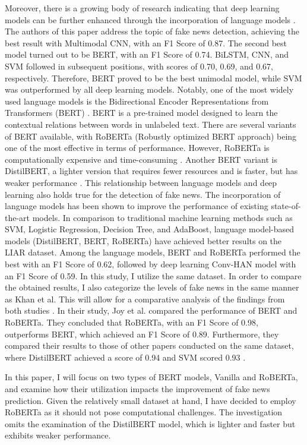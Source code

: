 Moreover, there is a growing body of research indicating that deep learning models can be further enhanced through the incorporation of language models \autocite{Conroy2015}. The authors of this paper address the topic of fake news detection, achieving the best result with Multimodal CNN, with an F1 Score of 0.87. The second best model turned out to be BERT, with an F1 Score of 0.74. BiLSTM, CNN, and SVM followed in subsequent positions, with scores of 0.70, 0.69, and 0.67, respectively. Therefore, BERT proved to be the best unimodal model, while SVM was outperformed by all deep learning models. Notably, one of the most widely used language models is the Bidirectional Encoder Representations from Transformers (BERT) \autocite{Devlin2018}. BERT is a pre-trained model designed to learn the contextual relations between words in unlabeled text. There are several variants of BERT available, with RoBERTa (Robustly optimized BERT approach) being one of the most effective in terms of performance. However, RoBERTa is computationally expensive and time-consuming \autocite{Liu2019}. Another BERT variant is DistilBERT, a lighter version that requires fewer resources and is faster, but has weaker performance \autocite{Sanh2019}. This relationship between language models and deep learning also holds true for the detection of fake news. The incorporation of language models has been shown to improve the performance of existing state-of-the-art models. In comparison to traditional machine learning methods such as SVM, Logistic Regression, Decision Tree, and AdaBoost, language model-based models (DistilBERT, BERT, RoBERTa) have achieved better results on the LIAR dataset. Among the language models, BERT and RoBERTa performed the best with an F1 Score of 0.62, followed by deep learning Conv-HAN model with an F1 Score of 0.59. In this study, I utilize the same dataset. In order to compare the obtained results, I also categorize the levels of fake news in the same manner as Khan et al. This will allow for a comparative analysis of the findings from both studies \autocite{Khan2021}. In their study, Joy et al. compared the performance of BERT and RoBERTa. They concluded that RoBERTa, with an F1 Score of 0.98, outperforms BERT, which achieved an F1 Score of 0.89. Furthermore, they compared their results to those of other papers conducted on the same dataset, where DistilBERT achieved a score of 0.94 and SVM scored 0.93 \autocite{Joy2022}.

In this paper, I will focus on two types of BERT models, Vanilla and RoBERTa, and examine how their utilization impacts the improvement of fake news prediction. Given the relatively small dataset at hand, I have decided to employ RoBERTa as it should not pose computational challenges. The investigation omits the examination of the DistilBERT model, which is lighter and faster but exhibits weaker performance.

